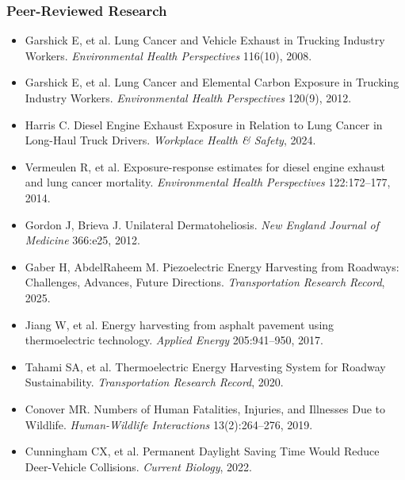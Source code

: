\documentclass[11pt,letterpaper]{article}
\begin{document}
\subsubsection{Peer-Reviewed Research}
\begin{itemize}
  \item Garshick E, et al. Lung Cancer and Vehicle Exhaust in Trucking Industry Workers. \textit{Environmental Health Perspectives} 116(10), 2008.
  \item Garshick E, et al. Lung Cancer and Elemental Carbon Exposure in Trucking Industry Workers. \textit{Environmental Health Perspectives} 120(9), 2012.
  \item Harris C. Diesel Engine Exhaust Exposure in Relation to Lung Cancer in Long-Haul Truck Drivers. \textit{Workplace Health \& Safety}, 2024.
  \item Vermeulen R, et al. Exposure-response estimates for diesel engine exhaust and lung cancer mortality. \textit{Environmental Health Perspectives} 122:172--177, 2014.
  \item Gordon J, Brieva J. Unilateral Dermatoheliosis. \textit{New England Journal of Medicine} 366:e25, 2012.
  \item Gaber H, AbdelRaheem M. Piezoelectric Energy Harvesting from Roadways: Challenges, Advances, Future Directions. \textit{Transportation Research Record}, 2025.
  \item Jiang W, et al. Energy harvesting from asphalt pavement using thermoelectric technology. \textit{Applied Energy} 205:941--950, 2017.
  \item Tahami SA, et al. Thermoelectric Energy Harvesting System for Roadway Sustainability. \textit{Transportation Research Record}, 2020.
  \item Conover MR. Numbers of Human Fatalities, Injuries, and Illnesses Due to Wildlife. \textit{Human-Wildlife Interactions} 13(2):264--276, 2019.
  \item Cunningham CX, et al. Permanent Daylight Saving Time Would Reduce Deer-Vehicle Collisions. \textit{Current Biology}, 2022.
\end{itemize}
\end{document}
